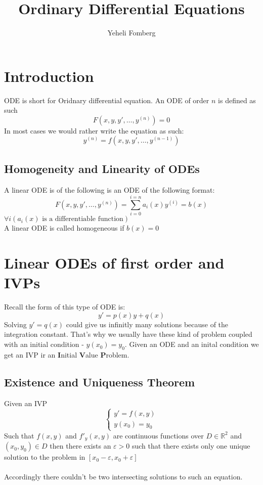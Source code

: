 \documentclass{article}
\title{\textbf{Ordinary Differential Equations}}
\author{Yeheli Fomberg}
\date{}
\newcommand{\R}{\mathbb{R}}
\begin{document}
	\maketitle
	\newpage
	\tableofcontents
	\newpage
	\section{Introduction}
	
	ODE is short for Oridnary differential equation.	An ODE of order $n$ is defined as such
	\[
		F(x,y,y',\ldots,y^{(n)})=0
	\]
	In most cases we would rather write the equation as such:
	\[
		y^{(n)}=f(x,y,y',\ldots,y^{(n-1)})
	\]
	\subsection{Homogeneity and Linearity of ODEs}
	A linear ODE is of the following is an ODE of the following format:
	\[
		F(x,y,y',\ldots,y^{(n)})=\sum_{i=0}^{i=n}{a_i(x)y^{(i)}}=b(x)
	\]
	$\forall i(a_i(x)\text{ is a differentiable function})$
	\\ A linear ODE is called homogeneous if $b(x)=0$	
	
	\newpage
	\section{Linear ODEs of first order and IVPs}
	Recall the form of this type of ODE is:
	\[
		y'=p(x)y+q(x)
	\]
	Solving $y'=q(x)$ could give us infinitly many solutions because of the integration constant. That's why we usually have these kind of problem coupled with an initial condition - $y(x_0)=y_0$. Given an ODE and an inital condition we get an IVP ir an \textbf{I}nitial \textbf{V}alue \textbf{P}roblem.
	\subsection{Existence and Uniqueness Theorem}
	Given an IVP
	\begin{equation}
    \begin{cases}
    y'=f(x,y) \\
    y(x_0)=y_0
    \end{cases}
	\end{equation}
	Such that $f(x,y)$ and $f'_y(x,y)$ are continuous functions over $D\in\R^2$ and $(x_0,y_0)\in D$ then there exists an $\varepsilon>0$ such that there exists only one unique solution to the problem in $[x_0-\varepsilon,x_0+\varepsilon]$ \\
	\\
	Accordingly there couldn't be two intersecting solutions to such an equation.
\end{document}
